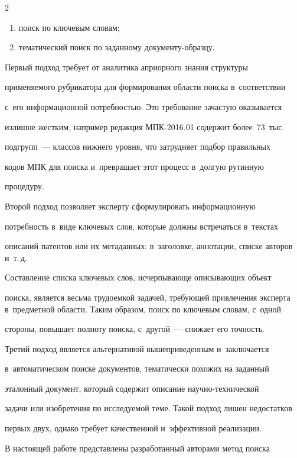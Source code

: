 \begin{multicols}{2}
\begin{enumerate}[(1)]
\item   поиск по ключевым словам;

\item   тематический поиск по заданному до\-ку\-мен\-ту-об\-разцу.

\end{enumerate}



  Первый подход требует от аналитика априорного знания структуры 

применяемого рубрикатора для формирования области поиска в~соответствии 

с~его информационной потребностью. Это требование зачастую оказывается 

излишне жестким, например редакция МПК-2016.01 содержит более~73~тыс.\ 

подгрупп~--- классов нижнего уровня, что затрудняет подбор правильных 

кодов МПК для поиска и~превращает этот процесс в~долгую рутинную 

процедуру.

  

  Второй подход позволяет эксперту сформулировать информационную 

потребность в~виде ключевых слов, которые должны встречаться в~текстах 

описаний патентов или их метаданных: в~заголовке, аннотации, списке авторов и~т.\,д. 

Составление списка ключевых слов, исчерпывающе опи\-сы\-ва\-ющих объект 

поиска, является весьма трудоемкой задачей, требующей привлечения эксперта в~предметной области. Таким образом, поиск по ключевым словам, с~одной 

стороны, повышает полноту поиска, с~другой~--- снижает его точность.

  

  Третий подход является альтернативой вышеприведенным и~заключается 

в~автоматическом поиске документов, тематически похожих на за\-данный 

эталонный документ, который содержит описа\-ние на\-уч\-но-тех\-ни\-че\-ской 

задачи или изобретения по исследуемой теме. Такой подход лишен недостатков 

первых двух, однако требует качественной и~эффективной реализации.

  

  В настоящей работе представлены разработанный авторами метод поиска 


\end{multicols}
